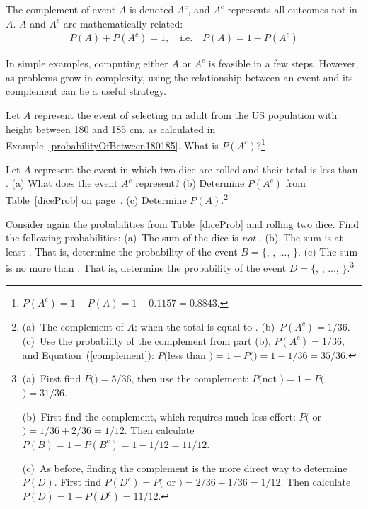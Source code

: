 \begin{termBox}{
The complement of event $A$ is denoted $A^c$, and $A^c$ represents all outcomes not in~$A$. $A$ and $A^c$ are mathematically related: \vspace{-2mm}
\begin{eqnarray}\label{complement}
P(A) + P(A^c) = 1, \quad\text{i.e.}\quad P(A) = 1-P(A^c)
\end{eqnarray}\vspace{-6.5mm}}
\end{termBox}

In simple examples, computing either $A$ or $A^c$ is feasible in a few steps. However, as problems grow in complexity, using the relationship between an event and its complement can be a useful strategy.

\begin{exercise}
	Let $A$ represent the event of selecting an adult from the US population with height between 180 and 185 cm, as calculated in Example~\ref{probabilityOfBetween180185}. What is $P(A^c)$?\footnote{$P(A^c) = 1 - P(A) = 1 - 0.1157 = 0.8843$.}
\end{exercise}

\begin{exercise}
Let $A$ represent the event in which two dice are rolled and their total is less than . (a) What does the event $A^c$ represent? (b) Determine $P(A^c)$ from Table~\ref{diceProb} on page~\pageref{diceProb}. (c) Determine $P(A)$.\footnote{(a)~The complement of $A$: when the total is equal to . (b)~$P(A^c) = 1/36$. (c)~Use the probability of the complement from part (b), $P(A^c) = 1/36$, and Equation~(\ref{complement}): $P($less than $) = 1 - P($$) = 1 - 1/36 = 35/36$.}
\end{exercise}

\begin{exercise} Consider again the probabilities from Table~\ref{diceProb} and rolling two dice. Find the following probabilities: (a)~The sum of the dice is \emph{not} . (b)~The sum is at least . That is, determine the probability of the event $B=\{$, , ..., $\}$. (c) The sum is no more than . That is, determine the probability of the event $D=\{$, , ..., $\}$.\footnote{(a)~First find $P($$)=5/36$, then use the complement: $P($not $) = 1 - P($$) = 31/36$.

(b)~First find  the complement, which requires much less effort: $P($ or $)=1/36+2/36=1/12$. Then calculate $P(B) = 1-P(B^c) = 1-1/12 = 11/12$.

(c)~As before, finding the complement is the more direct way to determine $P(D)$. First find $P(D^c) = P($ or $)=2/36 + 1/36=1/12$. Then calculate $P(D) = 1 - P(D^c) = 11/12$.}
\end{exercise}


